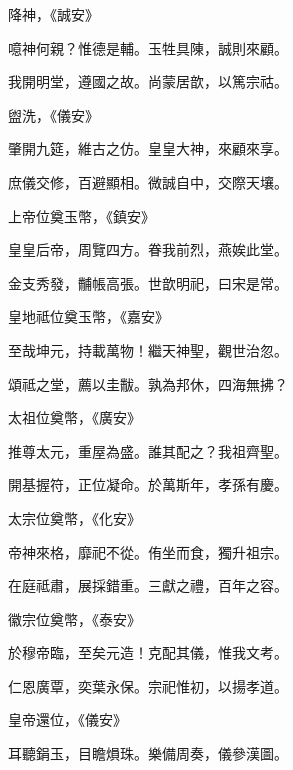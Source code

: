 \begin{pinyinscope}
 降神，《誠安》



 噫神何親？惟德是輔。玉牲具陳，誠則來顧。



 我開明堂，遵國之故。尚蒙居歆，以篤宗祜。



 盥洗，《儀安》



 肇開九筵，維古之仿。皇皇大神，來顧來享。



 庶儀交修，百避顯相。微誠自中，交際天壤。



 上帝位奠玉幣，《鎮安》



 皇皇后帝，周覽四方。眷我前烈，燕娭此堂。



 金支秀發，黼帳高張。世歆明祀，曰宋是常。



 皇地祗位奠玉幣，《嘉安》



 至哉坤元，持載萬物！繼天神聖，觀世治忽。



 頌祗之堂，薦以圭黻。孰為邦休，四海無拂？



 太祖位奠幣，《廣安》



 推尊太元，重屋為盛。誰其配之？我祖齊聖。



 開基握符，正位凝命。於萬斯年，孝孫有慶。



 太宗位奠幣，《化安》



 帝神來格，靡祀不從。侑坐而食，獨升祖宗。



 在庭祗肅，展採錯重。三獻之禮，百年之容。



 徽宗位奠幣，《泰安》



 於穆帝臨，至矣元造！克配其儀，惟我文考。



 仁恩廣覃，奕葉永保。宗祀惟初，以揚孝道。



 皇帝還位，《儀安》



 耳聽鋗玉，目瞻熉珠。樂備周奏，儀參漢圖。




\end{pinyinscope}
